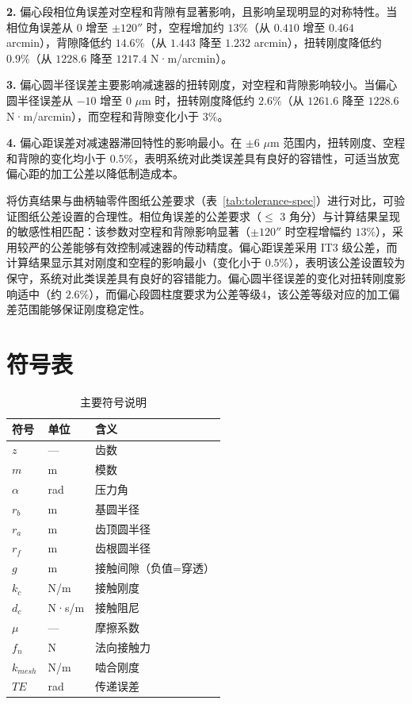 \documentclass[12pt]{ctexart}
\begin{document}
\textbf{2.} 偏心段相位角误差对空程和背隙有显著影响，且影响呈现明显的对称特性。当相位角误差从 $0$ 增至 $\pm 120''$ 时，空程增加约 $13\%$（从 $0.410$ 增至 $0.464$ arcmin），背隙降低约 $14.6\%$（从 $1.443$ 降至 $1.232$ arcmin），扭转刚度降低约 $0.9\%$（从 $1228.6$ 降至 $1217.4$ N·m/arcmin）。

\textbf{3.} 偏心圆半径误差主要影响减速器的扭转刚度，对空程和背隙影响较小。当偏心圆半径误差从 $-10$ 增至 $0$ $\mu$m 时，扭转刚度降低约 $2.6\%$（从 $1261.6$ 降至 $1228.6$ N·m/arcmin），而空程和背隙变化小于 $3\%$。

\textbf{4.} 偏心距误差对减速器滞回特性的影响最小。在 $\pm 6$ $\mu$m 范围内，扭转刚度、空程和背隙的变化均小于 $0.5\%$，表明系统对此类误差具有良好的容错性，可适当放宽偏心距的加工公差以降低制造成本。

将仿真结果与曲柄轴零件图纸公差要求（表~\ref{tab:tolerance-spec}）进行对比，可验证图纸公差设置的合理性。相位角误差的公差要求（$\le$ 3 角分）与计算结果呈现的敏感性相匹配：该参数对空程和背隙影响显著（$\pm 120''$ 时空程增幅约 $13\%$），采用较严的公差能够有效控制减速器的传动精度。偏心距误差采用 IT3 级公差，而计算结果显示其对刚度和空程的影响最小（变化小于 $0.5\%$），表明该公差设置较为保守，系统对此类误差具有良好的容错能力。偏心圆半径误差的变化对扭转刚度影响适中（约 $2.6\%$），而偏心段圆柱度要求为公差等级4，该公差等级对应的加工偏差范围能够保证刚度稳定性。




\appendix
\section{符号表}

\begin{table}[htbp]
\centering
\small
\begin{tabular}{lll}
\toprule
符号 & 单位 & 含义 \\ 
\midrule
$z$ & — & 齿数 \\ 
$m$ & m & 模数 \\ 
$\alpha$ & rad & 压力角 \\ 
$r_b$ & m & 基圆半径 \\ 
$r_a$ & m & 齿顶圆半径 \\ 
$r_f$ & m & 齿根圆半径 \\ 
$g$ & m & 接触间隙（负值=穿透） \\ 
$k_c$ & N/m & 接触刚度 \\ 
$d_c$ & N·s/m & 接触阻尼 \\ 
$\mu$ & — & 摩擦系数 \\ 
$f_n$ & N & 法向接触力 \\ 
$k_{mesh}$ & N/m & 啮合刚度 \\ 
$TE$ & rad & 传递误差 \\ 
\bottomrule
\end{tabular}
\caption{主要符号说明}
\end{table}
\end{document}
